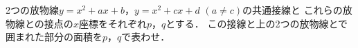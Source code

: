 \documentclass[../../main.tex]{subfiles}
\begin{document}
2つの放物線$y=x^2+ax+b$，$y=x^2+cx+d$ $(a \neq c)$の共通接線と
これらの放物線との接点の$x$座標をそれぞれ$p$，$q$とする．
この接線と上の2つの放物線とで囲まれた部分の面積を$p$，$q$で表わせ．
\end{document}
